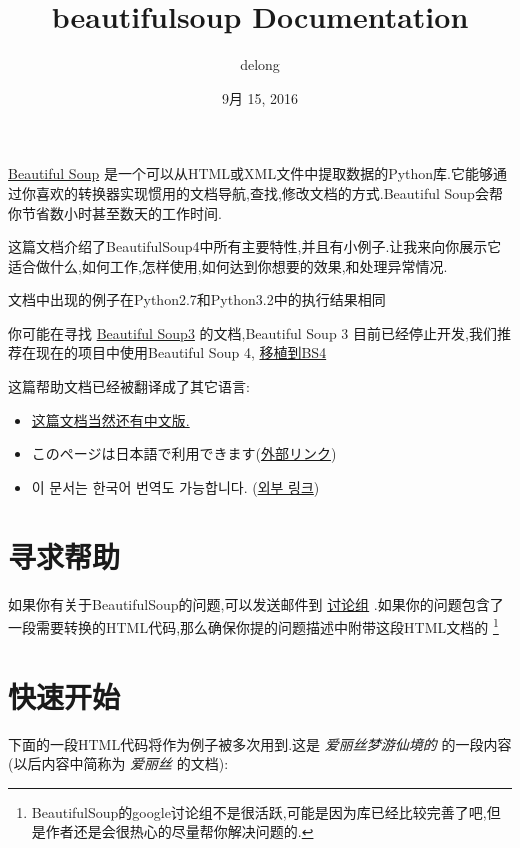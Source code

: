 \documentclass[letterpaper,12pt,english]{sphinxmanual}
\title{beautifulsoup Documentation}
\date{9月 15, 2016}
\author{delong}
\begin{document}
\maketitle
\tableofcontents
{}\label{index::doc}


\href{http://www.crummy.com/software/BeautifulSoup/}{Beautiful Soup} 是一个可以从HTML或XML文件中提取数据的Python库.它能够通过你喜欢的转换器实现惯用的文档导航,查找,修改文档的方式.Beautiful Soup会帮你节省数小时甚至数天的工作时间.

这篇文档介绍了BeautifulSoup4中所有主要特性,并且有小例子.让我来向你展示它适合做什么,如何工作,怎样使用,如何达到你想要的效果,和处理异常情况.

文档中出现的例子在Python2.7和Python3.2中的执行结果相同

你可能在寻找 \href{http://www.crummy.com/software/BeautifulSoup/bs3/documentation.html}{Beautiful Soup3} 的文档,Beautiful Soup 3 目前已经停止开发,我们推荐在现在的项目中使用Beautiful Soup 4, \href{http://www.baidu.com}{移植到BS4}

这篇帮助文档已经被翻译成了其它语言:
\begin{itemize}
\item {} 
\href{http://www.crummy.com/software/BeautifulSoup/bs4/doc/index.cn.html}{这篇文档当然还有中文版.}

\item {} 
このページは日本語で利用できます(\href{http://kondou.com/BS4/}{外部リンク})

\item {} 
이 문서는 한국어 번역도 가능합니다. (\href{http://coreapython.hosting.paran.com/etc/beautifulsoup4.html}{외부 링크})

\end{itemize}


\chapter{寻求帮助}
\label{index:beautiful-soup-4-4-0}\label{index:id4}
如果你有关于BeautifulSoup的问题,可以发送邮件到 \href{https://groups.google.com/forum/?fromgroups\#!forum/beautifulsoup}{讨论组} .如果你的问题包含了一段需要转换的HTML代码,那么确保你提的问题描述中附带这段HTML文档的 {\hyperref[index:id66]{}} \footnote[1]{\sphinxAtStartFootnote%
BeautifulSoup的google讨论组不是很活跃,可能是因为库已经比较完善了吧,但是作者还是会很热心的尽量帮你解决问题的.
}


\chapter{快速开始}
\label{index:id7}
下面的一段HTML代码将作为例子被多次用到.这是 \emph{爱丽丝梦游仙境的} 的一段内容(以后内容中简称为 \emph{爱丽丝} 的文档):
\end{document}
